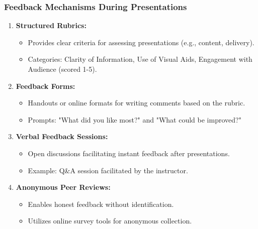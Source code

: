 \documentclass{beamer}
\begin{document}
\begin{frame}[fragile]
    \frametitle{Feedback Mechanisms During Presentations}
    \begin{enumerate}
        \item \textbf{Structured Rubrics:}
        \begin{itemize}
            \item Provides clear criteria for assessing presentations (e.g., content, delivery).
            \item Categories: Clarity of Information, Use of Visual Aids, Engagement with Audience (scored 1-5).
        \end{itemize}
        
        \item \textbf{Feedback Forms:}
        \begin{itemize}
            \item Handouts or online formats for writing comments based on the rubric.
            \item Prompts: "What did you like most?" and "What could be improved?"
        \end{itemize}
        
        \item \textbf{Verbal Feedback Sessions:}
        \begin{itemize}
            \item Open discussions facilitating instant feedback after presentations.
            \item Example: Q\&A session facilitated by the instructor.
        \end{itemize}
        
        \item \textbf{Anonymous Peer Reviews:}
        \begin{itemize}
            \item Enables honest feedback without identification.
            \item Utilizes online survey tools for anonymous collection.
        \end{itemize}
    \end{enumerate}
\end{frame}
\end{document}
